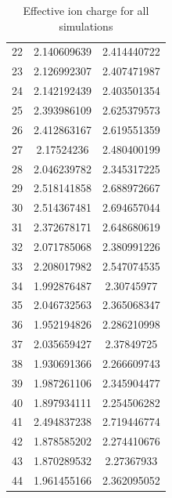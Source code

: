 \begin{table}
\begin{tabular}{c|c|c}
		22 & 2.140609639 & 2.414440722 \\ 
		23 & 2.126992307 & 2.407471987 \\ 
		24 & 2.142192439 & 2.403501354 \\ 
		25 & 2.393986109 & 2.625379573 \\ 
		26 & 2.412863167 & 2.619551359 \\ 
		27 & 2.17524236 & 2.480400199 \\ 
		28 & 2.046239782 & 2.345317225 \\ 
		29 & 2.518141858 & 2.688972667 \\ 
		30 & 2.514367481 & 2.694657044 \\
		31 & 2.372678171 & 2.648680619 \\ 
		32 & 2.071785068 & 2.380991226 \\ 
		33 & 2.208017982 & 2.547074535 \\ 
		34 & 1.992876487 & 2.30745977 \\ 
		35 & 2.046732563 & 2.365068347 \\ 
		36 & 1.952194826 & 2.286210998 \\ 
		37 & 2.035659427 & 2.37849725 \\ 
		38 & 1.930691366 & 2.266609743 \\ 
		39 & 1.987261106 & 2.345904477 \\ 
		40 & 1.897934111 & 2.254506282 \\ 
		41 & 2.494837238 & 2.719446774 \\ 
		42 & 1.878585202 & 2.274410676 \\ 
		43 & 1.870289532 & 2.27367933 \\ 
		44 & 1.961455166 & 2.362095052 \\ \hline
	\end{tabular}
	\caption{Effective ion charge for all simulations}
	\label{tab:Zeff}
\end{table}

